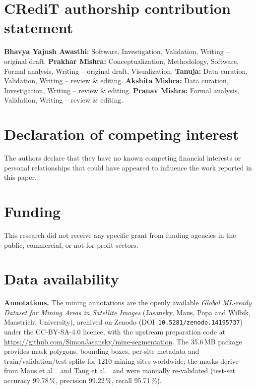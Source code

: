 \documentclass[review]{elsarticle}
\begin{document}
\section*{CRediT authorship contribution statement}
\noindent\textbf{Bhavya Yajush Awasthi:} Software, Investigation, Validation, Writing --
original draft. \textbf{Prakhar Mishra:} Conceptualization, Methodology, Software, Formal
analysis, Writing -- original draft, Visualization. \textbf{Tanuja:} Data curation,
Validation, Writing -- review \& editing. \textbf{Akshita Mishra:} Data curation,
Investigation, Writing -- review \& editing. \textbf{Pranav Mishra:} Formal analysis,
Validation, Writing -- review \& editing.

\section*{Declaration of competing interest}
\noindent The authors declare that they have no known competing financial interests or
personal relationships that could have appeared to influence the work reported in this paper.

\section*{Funding}
\noindent This research did not receive any specific grant from funding agencies in the
public, commercial, or not-for-profit sectors.

\section*{Data availability}
\noindent\textbf{Annotations.} The mining annotations are the openly available
\emph{Global ML-ready Dataset for Mining Areas in Satellite Images} (Jasansky, Maus, Popa and
Wilbik, Maastricht University), archived on Zenodo \citep{jasansky2024dataset}
(DOI~\texttt{10.5281/zenodo.14195737}) under the CC-BY-SA-4.0 licence, with the upstream
preparation code at \url{https://github.com/SimonJasansky/mine-segmentation}. The
\num{35.6}\,MB package provides mask polygons, bounding boxes, per-site metadata and
train/validation/test splits for \num{1210} mining sites worldwide; the masks derive from
Maus et al.\ \cite{maus2022global} and Tang et al.\ \cite{tang2023mining} and were manually
re-validated (test-set accuracy \num{99.78}\,\%, precision \num{99.22}\,\%, recall
\num{95.71}\,\%).
\end{document}
